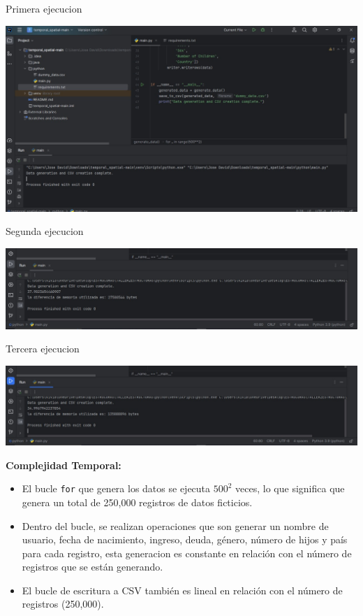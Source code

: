 \documentclass[a4paper,twocolumn,10pt]{article}
\begin{document}
Primera ejecucion

\includegraphics[width=1\linewidth]{HP AMD E1-1200 APU/py1.jpg}

Segunda ejecucion

\includegraphics[width=1\linewidth]{HP AMD E1-1200 APU/py2.jpg}

Tercera ejecucion

\includegraphics[width=1\linewidth]{HP AMD E1-1200 APU/py3.jpg}

\textbf{Complejidad Temporal:}
\begin{itemize}
    \item El bucle \texttt{for} que genera los datos se ejecuta \(500^2\) veces, lo que significa que genera un total de 250,000 registros de datos ficticios.
    \item Dentro del bucle, se realizan operaciones que son generar un nombre de usuario, fecha de nacimiento, ingreso, deuda, género, número de hijos y país para cada registro, esta generacion es constante en relación con el número de registros que se están generando.
    \item El bucle de escritura a CSV también es lineal en relación con el número de registros (250,000).
\end{itemize}
\end{document}
